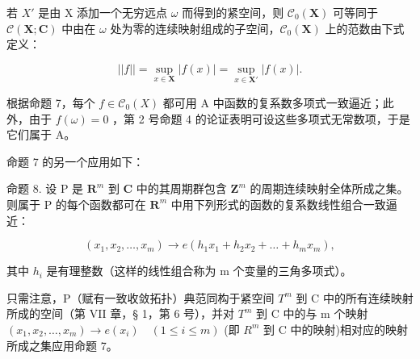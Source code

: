 若 \(X'\) 是由 X 添加一个无穷远点 \(\omega\) 而得到的紧空间，则 \(\mathcal{C}_{0}(\mathbf{X})\) 可等同于 \(\mathcal{C}(\mathbf{X};\mathbf{C})\) 中由在 \(\omega\) 处为零的连续映射组成的子空间，\(\mathcal{C}_{0}(\mathbf{X})\) 上的范数由下式定义：

\[
\left| \left| f \right| \right| = \sup _ {x \in \mathbf {X}} | f (x) | = \sup _ {x \in \mathbf {X}'} | f (x) |.
\]

根据命题 7，每个 \(f \in \mathcal{C}_{0}(X)\) 都可用 A 中函数的复系数多项式一致逼近；此外，由于 \(f(\omega) = 0\) ，第 2 号命题 4 的论证表明可设这些多项式无常数项，于是它们属于 A。

命题 7 的另一个应用如下：

命题 8. 设 P 是 \(\mathbf{R}^m\) 到 \(\mathbf{C}\) 中的其周期群包含 \(\mathbf{Z}^m\) 的周期连续映射全体所成之集。则属于 P 的每个函数都可在 \(\mathbf{R}^m\) 中用下列形式的函数的复系数线性组合一致逼近：

\[
(x _ {1}, x _ {2}, \dots , x _ {m}) \rightarrow e (h _ {1} x _ {1} + h _ {2} x _ {2} + \dots + h _ {m} x _ {m}),
\]

其中 \(h_{i}\) 是有理整数（这样的线性组合称为 m 个变量的三角多项式）。

只需注意，P（赋有一致收敛拓扑）典范同构于紧空间 \(T^{m}\) 到 C 中的所有连续映射所成的空间（第 VII 章，§ 1，第 6 号），并对 \(T^{m}\) 到 C 中的与 m 个映射 \((x_{1}, x_{2}, \ldots, x_{m}) \to e(x_{i}) \quad (1 \leqslant i \leqslant m)\) (即 \(R^{m}\) 到 C 中的映射)相对应的映射所成之集应用命题 7。

\ExerciseGroupsStart

